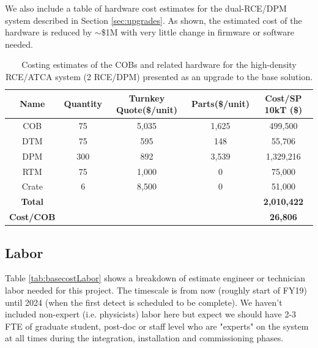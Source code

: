 We also include a table of hardware cost estimates for the dual-RCE/DPM system described in Section \ref{sec:upgrades}.  As shown, the estimated cost of the hardware is reduced by $\sim$\$1M with very little change in firmware or software needed.  


\begin{table}[htp]
\begin{center}
\begin{tabular}{|c|c|c|c|c|}
\hline
 Name  & Quantity & Turnkey Quote(\$/unit)      & Parts(\$/unit)            &     Cost/SP 10kT (\$) \\
  \hline
COB		&  75 	&	5,035		&	1,625		&	499,500\\
\hline
DTM		&  75 	&	595		&	148		&	55,706\\
\hline
DPM		&   300	&	892		&	3,539		&1,329,216	\\
\hline
RTM		&   75	&	1,000		&	0		&75,000	\\
\hline
Crate		&   6	&	8,500		&	0	&	51,000	\\
\hline
\hline
{\bf Total } &	\multicolumn{3}{r|}{} & {\bf 2,010,422}   \\
\hline
{\bf Cost/COB }& 	\multicolumn{3}{r|}{} &  {\bf  26,806 }  \\
\hline
\end{tabular}
\end{center}
\caption{ Costing estimates of the COBs and related hardware for the high-density RCE/ATCA system (2 RCE/DPM) presented as an upgrade to the base solution. }
\label{tab:HDMScost}
\end{table}%


\subsection{Labor}

Table \ref{tab:basecostLabor} shows a breakdown of estimate engineer or technician labor needed for this project.  The timescale is from now (roughly start of FY19) until 
2024 (when the first detect is scheduled to be complete).   We haven't included non-expert (i.e. physicists) labor here but expect we should have 2-3 FTE of graduate student, post-doc or staff level who are "experts" on the system at all times during the integration, installation and commissioning phases.  

